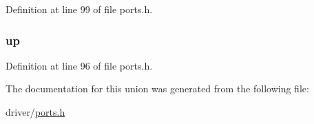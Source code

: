 \-Definition at line 99 of file ports.\-h.

\hypertarget{unions__button__flags_af8b4ed22215bcf4c202e7024db0a7342}{
\subsubsection[{up}]{ {\bf up}}}\label{unions__button__flags_af8b4ed22215bcf4c202e7024db0a7342}


\-Definition at line 96 of file ports.\-h.



\-The documentation for this union was generated from the following file\-:\begin{DoxyCompactItemize}
\item 
driver/\hyperlink{ports_8h}{ports.\-h}\end{DoxyCompactItemize}
